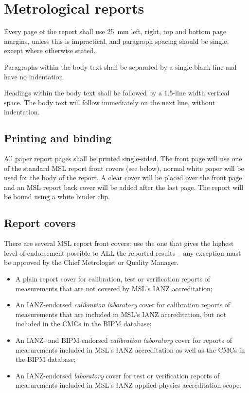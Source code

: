 \section{Metrological reports}
 \label{s:metrological_reports}
Every page of the report shall use \SI{25}{mm} left, right, top and bottom page margins, unless this is impractical, and paragraph spacing should be single, except where otherwise stated. 
 
Paragraphs within the body text shall be separated by a single blank line and have no indentation.

Headings within the body text shall be followed by a 1.5-line width vertical space. The body text will follow immediately on the next line, without indentation.

\subsection{Printing and binding}
All paper report pages shall be printed single-sided.  The front page will use one of the standard MSL report front covers (see below), normal white paper will be used for the body of the report. A clear cover will be placed over the front page and an MSL report back cover will be added after the last page. The report will be bound using a white binder clip.

\subsection{Report covers}
 \label{ss:report_covers}
There are several MSL report front covers: use the one that gives the highest level of endorsement possible to ALL the reported results – any exception must be approved by the Chief Metrologist or Quality Manager.

\begin{itemize}
\item	A plain report cover for calibration, test or verification reports of measurements that are not covered by MSL's IANZ accreditation;
\item	An IANZ-endorsed \textit{calibration laboratory} cover for calibration reports of measurements that are included in MSL's IANZ accreditation, but not included in the CMCs in the BIPM database;
\item	An IANZ- and BIPM-endorsed \textit{calibration laboratory} cover for reports of measurements included in MSL's IANZ accreditation as well as the CMCs in the BIPM database;
\item	An IANZ-endorsed \textit{laboratory} cover for test or verification reports of measurements included in MSL's IANZ applied physics accreditation scope.
\end{itemize}

